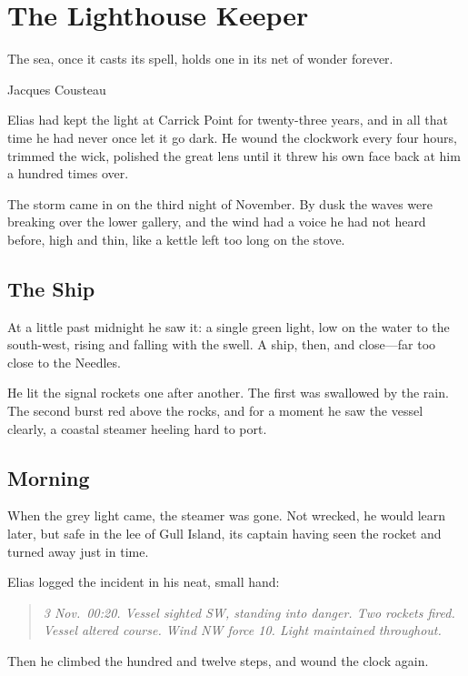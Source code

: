 \documentclass[11pt,oneside]{memoir}
\begin{document}
\chapter{The Lighthouse Keeper}

\epigraph{The sea, once it casts its spell, holds one in its net of wonder forever.}{Jacques Cousteau}

Elias had kept the light at Carrick Point for twenty-three years, and in all that time he
had never once let it go dark. He wound the clockwork every four hours, trimmed the wick,
polished the great lens until it threw his own face back at him a hundred times over.

The storm came in on the third night of November. By dusk the waves were breaking over
the lower gallery, and the wind had a voice he had not heard before, high and thin, like a
kettle left too long on the stove.

\section{The Ship}

At a little past midnight he saw it: a single green light, low on the water to the
south-west, rising and falling with the swell. A ship, then, and close---far too close to
the Needles.

He lit the signal rockets one after another. The first was swallowed by the rain. The
second burst red above the rocks, and for a moment he saw the vessel clearly, a coastal
steamer heeling hard to port.

\section{Morning}

When the grey light came, the steamer was gone. Not wrecked, he would learn later, but
safe in the lee of Gull Island, its captain having seen the rocket and turned away just in
time.

Elias logged the incident in his neat, small hand:

\begin{quote}
\textit{3 Nov.\ 00:20. Vessel sighted SW, standing into danger. Two rockets fired.
Vessel altered course. Wind NW force 10. Light maintained throughout.}
\end{quote}

Then he climbed the hundred and twelve steps, and wound the clock again.
\end{document}
